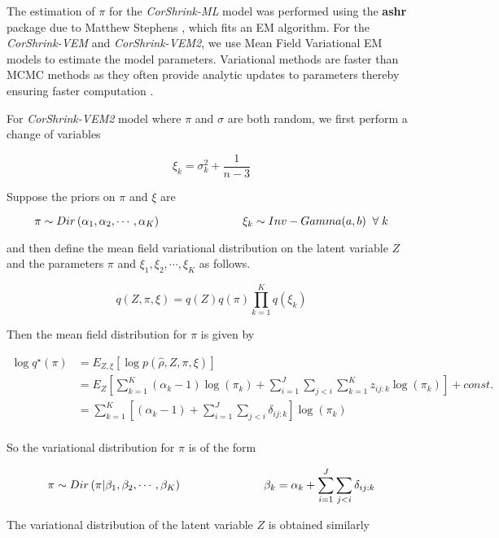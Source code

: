The estimation of $\pi$ for the \textit{CorShrink-ML} model was performed using the \textbf{ashr} package due to Matthew Stephens \cite{Stephens2016}, which fits an EM algorithm. For the \textit{CorShrink-VEM} and \textit{CorShrink-VEM2}, we use Mean Field Variational EM models to estimate the model parameters. Variational methods are faster than MCMC methods as they often provide analytic updates to parameters thereby ensuring faster computation \cite{Beal2003} \cite{Beli2016}.

For \textit{CorShrink-VEM2} model where $\pi$ and $\sigma$ are both random, we first perform a change of variables 

$$ \xi_{k} = \sigma^2_{k} + \frac{1}{n-3} $$

Suppose the priors on $\pi$ and $\xi$ are 

$$ \pi \sim Dir \left ( \alpha_1, \alpha_2, \cdots, \alpha_{K} \right ) \hspace{1 in} \xi_{k} \sim Inv-Gamma(a, b) \;\; \forall \; k $$

and then define the mean field variational distribution on the latent variable $Z$ and the parameters $\pi$ and $\xi_1, \xi_2, \cdots, \xi_{K}$ as follows. 

$$  q(Z, \pi, \xi) = q(Z) q(\pi) \prod_{k=1}^{K} q(\xi_{k})   $$

Then the mean field distribution for $\pi$ is given by 

\begin{align}
\log q^{\star} (\pi)  & = E_{Z, \xi} \left [   \log p (\hat{\rho}, Z, \pi, \xi ) \right ]   \\
			    & = E_{Z} \left [ \sum_{k=1}^{K} \left (\alpha_{k} - 1\right) \log (\pi_k) + \sum_{i=1}^{J} \sum_{j < i} \sum_{k=1}^{K} z_{ij:k} \log (\pi_{k} ) \right ]  + const. \\
			    & = \sum_{k=1}^{K} \left [   \left (\alpha_{k} - 1\right)  + \sum_{i=1}^{J} \sum_{j < i}  \delta_{ij:k} \right]\log (\pi_{k})  \\
\end{align}

So the variational distribution for $\pi$ is of the form 

\begin{equation}
\pi \sim Dir \left (   \pi | \beta_1, \beta_2, \cdots, \beta_{K} \right ) \hspace{1 in}   \beta_{k} = \alpha_{k} + \sum_{i=1}^{J} \sum_{j < i} \delta_{ij:k} 
\end{equation}

The variational distribution of the latent variable $Z$ is obtained similarly

